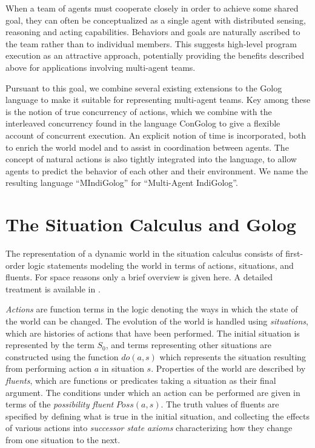 \documentclass[letterpaper]{article}
\begin{document}
When a team of agents must cooperate closely in order to achieve some
shared goal, they can often be conceptualized as a single agent with
distributed sensing, reasoning and acting capabilities. Behaviors
and goals are naturally ascribed to the team rather than to individual
members.
This suggests high-level program execution as an attractive
approach, potentially providing the benefits described above for applications
involving multi-agent teams.

Pursuant to this goal, we combine several existing extensions to the
Golog language to make it suitable for representing multi-agent teams.
Key among these is the notion of true concurrency of actions, which
we combine with the interleaved concurrency found in the language
ConGolog to give a flexible account of concurrent
execution. An explicit notion of time is incorporated, both to enrich
the world model and to assist in coordination between agents. The
concept of natural actions is also tightly
integrated into the language, to allow agents to predict the behavior
of each other and their environment. We name the resulting language
``MIndiGolog'' for ``Multi-Agent IndiGolog''.

\section{The Situation Calculus and Golog}

The representation of a dynamic world in the situation calculus consists
of first-order logic statements modeling the world in terms of actions,
situations, and fluents.
For space reasons only a brief overview is given here.
A detailed treatment
is available in \cite{pirri99contributions_sitcalc}.

\emph{Actions} are function terms in the logic denoting the ways
in which the state of the world can be changed.
The evolution of the world is handled using \emph{situations}, which
are histories of actions that have been performed. The initial situation
is represented by the term $S_{0}$, and terms representing other situations
are constructed using the function $do(a,s)$ which represents the
situation resulting from performing action $a$ in situation $s$.
Properties of the world are described by \emph{fluents}, which are
functions or predicates taking a situation as their final argument.
The conditions under which an action can be performed are given in
terms of the \emph{possibility fluent} $Poss(a,s)$. The truth values
of fluents are specified by defining what is true in the initial situation,
and collecting the effects of various actions into \emph{successor
state axioms} characterizing how they change from one situation to
the next.
\end{document}
